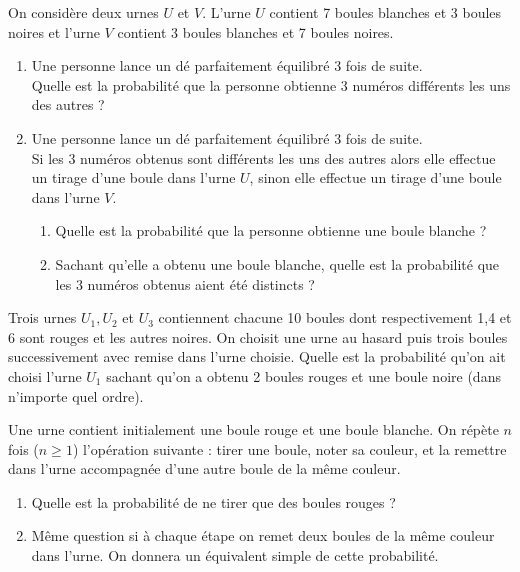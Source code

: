 \documentclass[a4paper,10pt]{report}
\begin{document}
\begin{Exercice}{} On considère deux urnes $U$ et $V$. L'urne $U$ contient 7 boules blanches et 3 boules noires et l'urne $V$ contient 3 boules blanches et 7 boules noires.

\begin{enumerate}
\item Une personne lance un dé parfaitement équilibré 3 fois de suite.\\
 Quelle est la probabilité que la personne obtienne 3 numéros différents les uns des autres ?
\item Une personne lance un dé parfaitement équilibré 3 fois de suite.\\
Si les 3 numéros obtenus sont différents les uns des autres alors elle effectue un tirage d'une boule dans l'urne $U$, sinon elle effectue un tirage d'une boule dans l'urne $V$.
\begin{enumerate}
\item Quelle est la probabilité que la personne obtienne une boule blanche ?
\item Sachant qu'elle a obtenu une boule blanche, quelle est la probabilité que les 3 numéros obtenus aient été distincts ?
\end{enumerate}
\end{enumerate}
\end{Exercice} 


\begin{Exercice}{} Trois urnes $U_1, U_2 $ et $U_3$ contiennent chacune 10 boules dont respectivement 1,4 et 6 sont rouges et les autres noires. On choisit une urne au hasard puis trois boules successivement avec remise dans l'urne choisie. Quelle est la probabilité qu'on ait choisi l'urne $U_1$ sachant qu'on a obtenu 2 boules rouges et une boule noire (dans n'importe quel ordre).
\end{Exercice}

\begin{Exercice}{} Une urne contient initialement une boule rouge et une boule blanche. On répète $n$ fois ($n \geq 1$) l'opération suivante : tirer une boule, noter sa couleur, et la remettre dans l'urne accompagnée d'une autre boule de la même couleur. 

\begin{enumerate}
\item Quelle est la probabilité de ne tirer que des boules rouges ?
\item Même question si à chaque étape on remet deux boules de la même couleur dans l'urne. On donnera un équivalent simple de cette probabilité.
\end{enumerate}
\end{Exercice} 
\end{document}
